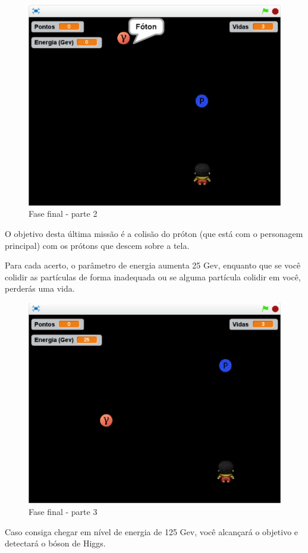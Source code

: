 \documentclass[12pt,fleqn]{book} %
\begin{document}
\begin{figure}[h]
	\centering
	\includegraphics[width=0.65 \textwidth]{Produto/final2}
	\caption{Fase final - parte 2}
	\label{fig:app_a:final2}
\end{figure}

\newpage

O objetivo desta última missão é a colisão do próton (que está com o personagem principal) com os prótons que descem sobre a tela.

Para cada acerto, o parâmetro de energia aumenta 25 Gev, enquanto que se você colidir as partículas de forma inadequada ou se alguma partícula colidir em você, perderás uma vida.

\begin{figure}[h]
	\centering
	\includegraphics[width=0.65 \textwidth]{Produto/final3}
	\caption{Fase final - parte 3}
	\label{fig:app_a:final3}
\end{figure}


Caso consiga chegar em nível de energia de 125 Gev, você alcançará o objetivo e detectará o bóson de Higgs.
\end{document}
